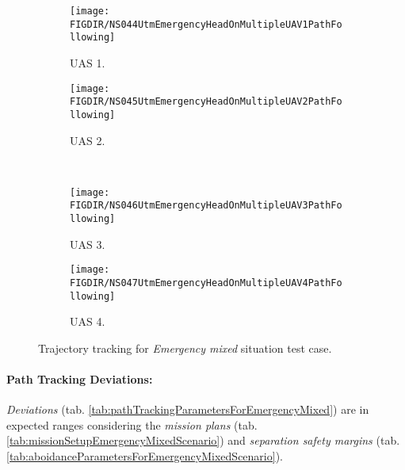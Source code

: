     
    \begin{figure}[H]
        \centering
        \begin{subfigure}{0.48\textwidth}
        	\centering
            \texttt{[image: \\FIGDIR/NS044UtmEmergencyHeadOnMultipleUAV1PathFollowing]}
            \caption{UAS 1.}
            \label{fig:emergencyMixedPathTrackingUAS1}
        \end{subfigure}
        \begin{subfigure}{0.48\textwidth}
        	\centering
            \texttt{[image: \\FIGDIR/NS045UtmEmergencyHeadOnMultipleUAV2PathFollowing]} 
            \caption{UAS 2.}
            \label{fig:emergencyMixedPathTrackingUAS2}
        \end{subfigure}
        \\
        \begin{subfigure}{0.48\textwidth}
        	\centering
            \texttt{[image: \\FIGDIR/NS046UtmEmergencyHeadOnMultipleUAV3PathFollowing]} 
            \caption{UAS 3.}
            \label{fig:emergencyMixedPathTrackingUAS4}
        \end{subfigure}
        \begin{subfigure}{0.48\textwidth}
        	\centering
            \texttt{[image: \\FIGDIR/NS047UtmEmergencyHeadOnMultipleUAV4PathFollowing]} 
            \caption{UAS 4.}
            \label{fig:emergencyMixedPathTrackingUAS3}
        \end{subfigure}
        \caption{Trajectory tracking for \emph{Emergency mixed} situation test case.}
        \label{fig:testCaseEmergencyMixedTrajectoryTracking}
    \end{figure}
    
    \noindent\paragraph{Path Tracking Deviations:} \emph{Deviations} (tab. \ref{tab:pathTrackingParametersForEmergencyMixed}) are in expected ranges considering the \emph{mission plans} (tab. \ref{tab:missionSetupEmergencyMixedScenario}) and \emph{separation safety margins} (tab. \ref{tab:aboidanceParametersForEmergencyMixedScenario}).
    
